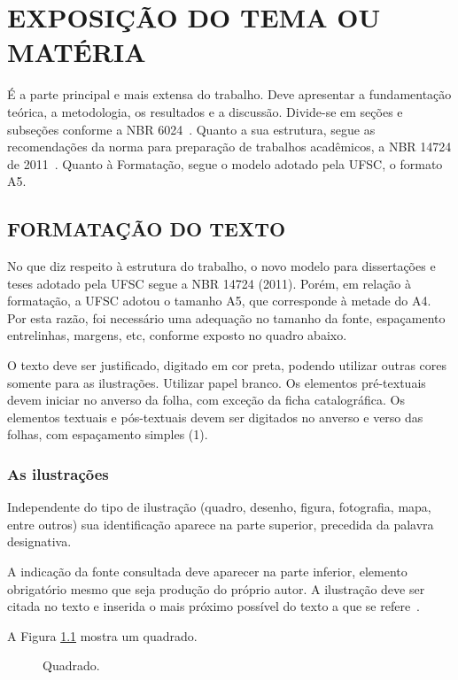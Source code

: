 \chapter{EXPOSIÇÃO DO TEMA OU MATÉRIA}

É a parte principal e mais extensa do trabalho.
Deve apresentar a fundamentação teórica,
a metodologia,
os resultados
e a discussão.
Divide-se em seções e subseções
conforme a NBR 6024~\cite{abnt14724}.
Quanto a sua estrutura,
segue as recomendações da norma
para preparação de trabalhos acadêmicos,
a NBR 14724 de 2011~\cite{abnt14724}.
Quanto à Formatação,
segue o modelo adotado pela UFSC, o formato A5.

\section{FORMATAÇÃO DO TEXTO}

No que diz respeito à estrutura do trabalho,
o novo modelo para dissertações e teses
adotado pela UFSC
segue a NBR 14724 (2011).
Porém, em relação à formatação,
a UFSC adotou o tamanho A5,
que corresponde à metade do A4.
Por esta razão,
foi necessário uma adequação no tamanho da fonte,
espaçamento entrelinhas,
margens,
etc,
conforme exposto no quadro abaixo.

O texto deve ser justificado,
digitado em cor preta,
podendo utilizar outras cores
somente para as ilustrações.
Utilizar papel branco.
Os elementos pré-textuais
devem iniciar no anverso da folha,
com exceção da ficha catalográfica.
Os elementos textuais e pós-textuais
devem ser digitados no anverso e verso das folhas,
com espaçamento simples (1).

\subsection{As ilustrações}

Independente do tipo de ilustração 
(quadro, desenho, figura, fotografia, mapa, entre outros)
sua identificação aparece na parte superior,
precedida da palavra designativa.

A indicação da fonte consultada
deve aparecer na parte inferior,
elemento obrigatório mesmo que seja produção do próprio autor.
A ilustração deve ser citada no texto
e inserida o mais próximo possível do texto
a que se refere~\cite{abnt14724}.

A Figura \ref{fig:a} mostra um quadrado.
\begin{figure}[!htb]
   \centering
   \caption{Quadrado.}\label{fig:a}
\end{figure}

